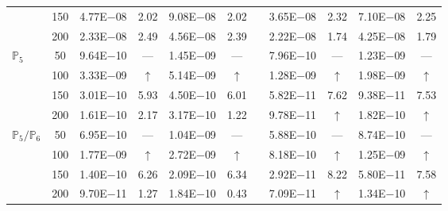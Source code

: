 \begin{table}[H]
{\begin{tabular}{@{}l c c c c c c c c c c@{}}
 & 150 & 4.77E$-$08 & 2.02  & 9.08E$-$08 & 2.02 &  & 3.65E$-$08 & 2.32 & 7.10E$-$08 & 2.25\\
 & 200 & 2.33E$-$08 & 2.49  & 4.56E$-$08 & 2.39 &  & 2.22E$-$08 & 1.74 & 4.25E$-$08 & 1.79\\
\midrule
\multirow{4}{*}{$\mathbb{P}_{5}$}
 & 50 & 9.64E$-$10 & ---  & 1.45E$-$09 & --- &  & 7.96E$-$10 & --- & 1.23E$-$09 & ---\\
 & 100 & 3.33E$-$09 & $\uparrow$  & 5.14E$-$09 & $\uparrow$ &  & 1.28E$-$09 & $\uparrow$ & 1.98E$-$09 & $\uparrow$\\
 & 150 & 3.01E$-$10 & 5.93  & 4.50E$-$10 & 6.01 &  & 5.82E$-$11 & 7.62 & 9.38E$-$11 & 7.53\\
 & 200 & 1.61E$-$10 & 2.17  & 3.17E$-$10 & 1.22 &  & 9.78E$-$11 & $\uparrow$ & 1.82E$-$10 & $\uparrow$\\
\midrule
\multirow{4}{*}{$\mathbb{P}_{5}/\mathbb{P}_{6}$}
 & 50 & 6.95E$-$10 & ---  & 1.04E$-$09 & --- &  & 5.88E$-$10 & --- & 8.74E$-$10 & ---\\
 & 100 & 1.77E$-$09 & $\uparrow$  & 2.72E$-$09 & $\uparrow$ &  & 8.18E$-$10 & $\uparrow$ & 1.25E$-$09 & $\uparrow$\\
 & 150 & 1.40E$-$10 & 6.26  & 2.09E$-$10 & 6.34 &  & 2.92E$-$11 & 8.22 & 5.80E$-$11 & 7.58\\
 & 200 & 9.70E$-$11 & 1.27  & 1.84E$-$10 & 0.43 &  & 7.09E$-$11 & $\uparrow$ & 1.34E$-$10 & $\uparrow$\\
\bottomrule
\end{tabular}}
\label{none}
\end{table}
